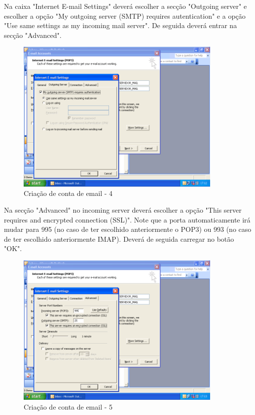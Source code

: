 Na caixa "Internet E-mail Settings" deverá escolher a secção "Outgoing server" e escolher a opção "My outgoing server (SMTP) requires autentication" e a opção "Use same settings as my incoming mail server". De seguida deverá entrar na secção "Advanced".

\begin{figure}[H]
    \begin{center}
        \includegraphics[width=10cm]{include/img/outlook2003_5}
    \end{center}
    \caption{Criação de conta de email - 4}
    \label{fig:OUTLK2k36}
\end{figure}

Na secção "Advanced" no incoming server deverá escolher a opção "This server requires and encrypted connection (SSL)". Note que a porta automaticamente irá mudar para 995 (no caso de ter escolhido anteriormente o POP3) ou 993 (no caso de ter escolhido anteriormente IMAP). Deverá de seguida carregar no botão "OK".

\begin{figure}[H]
    \begin{center}
        \includegraphics[width=10cm]{include/img/outlook2003_6}
    \end{center}
    \caption{Criação de conta de email - 5}
    \label{fig:OUTLK2k37}
\end{figure}

